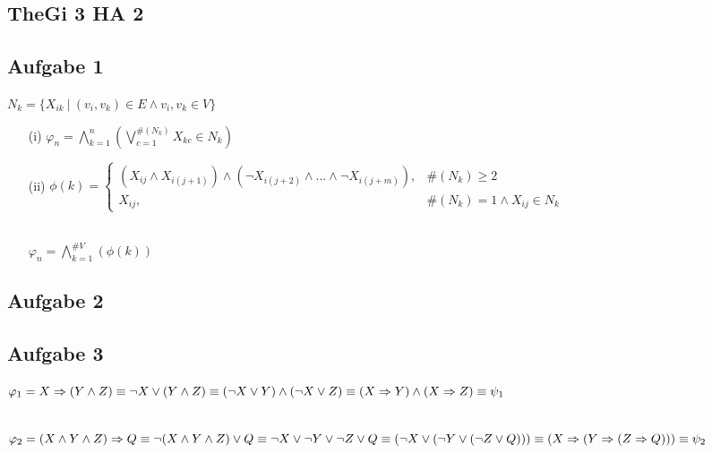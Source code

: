 \documentclass{article}
\begin{document}
	\begin{Large}
	\section*{TheGi 3 HA 2}	
	\subsection*{Aufgabe 1}
	
	\( N_k = \{X_{ik}~|~(v_i,v_k) \in E \wedge v_i,v_k \in V \} \)
	
	\begin{enumerate}
	\item[(i)]	
	\( \varphi_n = \bigwedge\limits_{k = 1}^{n} (\bigvee\limits_{c = 1}^{\#(N_k)} X_{kc} \in  N_k) \)

	\item[(ii)]
	\( \phi(k) = \begin{cases}	
	(X_{ij} \wedge X_{i(j+1)}) \wedge (\neg X_{i(j+2)} \wedge ... \wedge \neg X_{i(j+m)}), & \#(N_k) \geq 2\\
	X_{ij}, & \#(N_k) = 1 \wedge X_{ij} \in N_k 	
	\end{cases} \)
	
	\ \\ \( \varphi_n = \bigwedge\limits_{k = 1}^{\#V} (\phi(k))
	\)
	
	\end{enumerate}
	
	\subsection*{Aufgabe 2}	
	
	\subsection*{Aufgabe 3}
	
	\( \varphi_1 = X \Rightarrow (Y \wedge Z) \\
	\equiv \neg X \vee (Y \wedge Z) \\
	\equiv (\neg X \vee Y) \wedge (\neg X \vee Z) \\
	\equiv (X \Rightarrow Y) \wedge (X \Rightarrow Z) \\
	\equiv \psi_1 \\
	\) 
	
	\ \\ \( \varphi_2 = (X \wedge Y \wedge Z) \Rightarrow Q \\
	\equiv \neg (X \wedge Y \wedge Z) \vee Q \\
	\equiv \neg X \vee \neg Y \vee \neg Z \vee Q \\
	\equiv (\neg X \vee (\neg Y \vee (\neg Z \vee Q))) \\
	\equiv (X \Rightarrow (Y \Rightarrow (Z \Rightarrow Q))) \\
	\equiv \psi_2 \\
	\) 
	

\end{Large}
\end{document}

